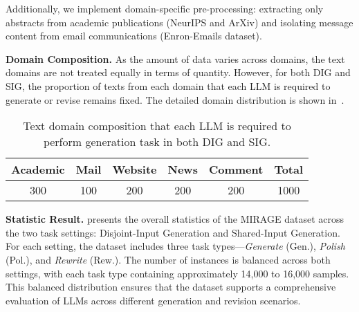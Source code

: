 \documentclass[sigconf, screen, review, anonymous]{acmart}
\begin{document}
Additionally, we implement domain-specific pre-processing: extracting only abstracts from academic publications (NeurIPS and ArXiv) and isolating message content from email communications (Enron-Emails dataset).

\noindent \textbf{Domain Composition. }
As the amount of data varies across domains, the text domains are not treated equally in terms of quantity.
%
However, for both DIG and SIG, the proportion of texts from each domain that each LLM is required to generate or revise remains fixed.
%
The detailed domain distribution is shown in~.

\begin{table}[htbp]
    \centering
    \renewcommand{\arraystretch}{1.25}
    \caption{Text domain composition that each LLM is required to perform generation task in both DIG and SIG.}
    \begin{tabular}{ccccc|c}
    \hline

    \hline

    \hline
    Academic& Mail & Website & News & Comment & \textbf{Total}  \\
    \hline
    300 & 100 & 200 & 200 & 200 & 1000 \\
    \hline

    \hline

    \hline
    \end{tabular}
    \label{tab:domain_composition}
\end{table}

\noindent \textbf{Statistic Result. }
 presents the overall statistics of the MIRAGE dataset across the two task settings: Disjoint-Input Generation and Shared-Input Generation.
%
For each setting, the dataset includes three task types—\textit{Generate} (Gen.), \textit{Polish} (Pol.), and \textit{Rewrite} (Rew.).
%
The number of instances is balanced across both settings, with each task type containing approximately 14,000 to 16,000 samples.
%
This balanced distribution ensures that the dataset supports a comprehensive evaluation of LLMs across different generation and revision scenarios.

\begin{table}[htbp]
    \centering
    \renewcommand{\arraystretch}{1.1}
    \caption{Statistic result of MIRAGE.}
    \label{tab:statistic}
\end{table}
\end{document}
